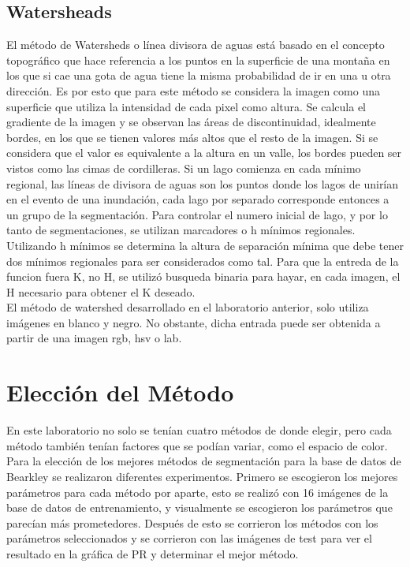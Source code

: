\documentclass[10pt,twocolumn,letterpaper]{article}
\begin{document}
\subsection{Watersheads}
El método de Watersheds o línea divisora de aguas está basado en el concepto topográfico que hace referencia a los puntos en la superficie de una montaña en los que si cae una gota de agua tiene la misma probabilidad de ir en una u otra dirección.  Es por esto que para este método se considera la imagen como una superficie que utiliza la intensidad de cada pixel como altura. Se calcula el gradiente de la imagen y se observan las áreas de discontinuidad, idealmente bordes, en los que se tienen valores más altos que el resto de la imagen. Si se considera que el valor es equivalente a la altura en un valle, los bordes pueden ser vistos como las cimas de cordilleras. Si un lago comienza en cada mínimo regional, las líneas de divisora de aguas son los puntos donde los lagos de unirían en el evento de una inundación, cada lago por separado corresponde entonces a un grupo de la segmentación. Para controlar el numero inicial de lago, y por lo tanto de segmentaciones, se utilizan marcadores o h mínimos regionales. Utilizando h mínimos se determina la altura de separación mínima que debe tener dos mínimos regionales para ser considerados como tal. Para que la entreda de la funcion fuera K, no H, se utilizó busqueda binaria para hayar, en cada imagen, el H necesario para obtener el K deseado.\\
El método de watershed desarrollado en el laboratorio anterior, solo utiliza imágenes en blanco y negro. No obstante, dicha entrada puede ser obtenida a partir de una imagen rgb, hsv o lab.

\section{Elección del Método}
En este laboratorio no solo se tenían cuatro métodos de donde elegir, pero cada método también tenían factores que se podían variar, como el espacio de color. Para la elección de los mejores métodos de segmentación para la base de datos de Bearkley se realizaron diferentes experimentos. Primero se escogieron los mejores parámetros para cada método por aparte, esto se realizó con 16 imágenes de la base de datos de entrenamiento, y visualmente se escogieron los parámetros que parecían más prometedores. Después de esto se corrieron los métodos con los parámetros seleccionados y se corrieron con las imágenes de test para ver el resultado en la gráfica de PR y determinar el mejor método. 
\end{document}
